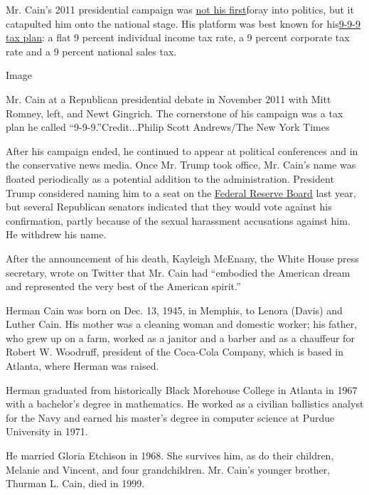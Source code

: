 Mr. Cain's 2011 presidential campaign was
\href{https://www.theatlantic.com/politics/archive/2011/10/herman-cain-for-senate-the-inside-story-of-his-first-insurgent-campaign/246668/}{not
his first}foray into politics, but it catapulted him onto the national
stage. His platform was best known for
his\href{https://www.nytimes.com/2011/10/13/us/politics/herman-cains-tax-plan-changes-gop-primary-math.html}{9-9-9
tax plan}: a flat 9 percent individual income tax rate, a 9 percent
corporate tax rate and a 9 percent national sales tax.

Image

Mr. Cain at a Republican presidential debate in November 2011 with Mitt
Romney, left, and Newt Gingrich. The cornerstone of his campaign was a
tax plan he called ``9-9-9.''Credit...Philip Scott Andrews/The New York
Times

After his campaign ended, he continued to appear at political
conferences and in the conservative news media. Once Mr. Trump took
office, Mr. Cain's name was floated periodically as a potential addition
to the administration. President Trump considered naming him to a seat
on the
\href{https://www.nytimes.com/2019/04/22/us/politics/trump-herman-cain-federal-reserve.html}{Federal
Reserve Board} last year, but several Republican senators indicated that
they would vote against his confirmation, partly because of the sexual
harassment accusations against him. He withdrew his name.

After the announcement of his death, Kayleigh McEnany, the White House
press secretary, wrote on Twitter that Mr. Cain had ``embodied the
American dream and represented the very best of the American spirit.''

Herman Cain was born on Dec. 13, 1945, in Memphis, to Lenora (Davis) and
Luther Cain. His mother was a cleaning woman and domestic worker; his
father, who grew up on a farm, worked as a janitor and a barber and as a
chauffeur for Robert W. Woodruff, president of the Coca-Cola Company,
which is based in Atlanta, where Herman was raised.

Herman graduated from historically Black Morehouse College in Atlanta in
1967 with a bachelor's degree in mathematics. He worked as a civilian
ballistics analyst for the Navy and earned his master's degree in
computer science at Purdue University in 1971.

He married Gloria Etchison in 1968. She survives him, as do their
children, Melanie and Vincent, and four grandchildren. Mr. Cain's
younger brother, Thurman L. Cain, died in 1999.


